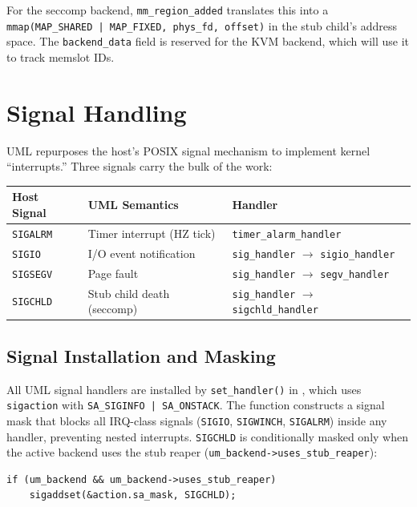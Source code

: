 For the seccomp backend, \texttt{mm\_region\_added} translates this into a
\texttt{mmap(MAP\_SHARED | MAP\_FIXED, phys\_fd, offset)} in the stub child's
address space.  The \texttt{backend\_data} field is reserved for the KVM
backend, which will use it to track memslot IDs.

\section{Signal Handling}
\label{sec:impl-signals}

UML repurposes the host's POSIX signal mechanism to implement kernel
``interrupts.''  Three signals carry the bulk of the work:

\begin{center}
\begin{tabular}{lll}
\toprule
\textbf{Host Signal} & \textbf{UML Semantics} & \textbf{Handler} \\
\midrule
\texttt{SIGALRM} & Timer interrupt (HZ tick) & \texttt{timer\_alarm\_handler} \\
\texttt{SIGIO}   & I/O event notification    & \texttt{sig\_handler} $\to$ \texttt{sigio\_handler} \\
\texttt{SIGSEGV} & Page fault                & \texttt{sig\_handler} $\to$ \texttt{segv\_handler} \\
\texttt{SIGCHLD} & Stub child death (seccomp) & \texttt{sig\_handler} $\to$ \texttt{sigchld\_handler} \\
\bottomrule
\end{tabular}
\end{center}

\subsection{Signal Installation and Masking}
\label{sec:impl-signal-masking}

All UML signal handlers are installed by \texttt{set\_handler()} in
, which uses \texttt{sigaction} with
\texttt{SA\_SIGINFO | SA\_ONSTACK}.  The function constructs a signal mask
that blocks all IRQ-class signals (\texttt{SIGIO}, \texttt{SIGWINCH},
\texttt{SIGALRM}) inside any handler, preventing nested interrupts.
\texttt{SIGCHLD} is conditionally masked only when the active backend
uses the stub reaper (\texttt{um\_backend->uses\_stub\_reaper}):

\begin{lstlisting}[language=KernelC,caption={Conditional SIGCHLD masking based on backend capability},label=lst:sigchld-mask]
if (um_backend && um_backend->uses_stub_reaper)
    sigaddset(&action.sa_mask, SIGCHLD);
\end{lstlisting}

